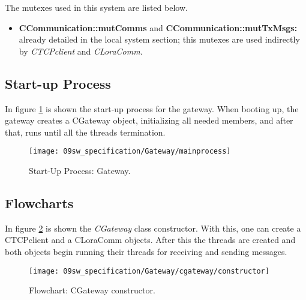 
The mutexes used in this system are listed below.

\begin{itemize}
	\item \textbf{CCommunication::mutComms} and \textbf{CCommunication::mutTxMsgs:} already detailed in the local system section; this mutexes are used indirectly by \textit{CTCPclient} and \textit{CLoraComm}.
\end{itemize}

\subsection{Start-up Process}
In figure \ref{fig:bootGateway} is shown the start-up process for the gateway. When booting up, the gateway creates a CGateway object, initializing all needed members, and after that, runs until all the threads termination.

\begin{figure}[H]
	\centering		\texttt{[image: 09sw\_specification/Gateway/mainprocess]}
	\caption{Start-Up Process: Gateway.}
	\label{fig:bootGateway}
\end{figure}

\clearpage
\subsection{Flowcharts}


In figure \ref{fig:gwtCGatewayconstructor} is shown the \textit{CGateway} class constructor. With this, one can create a CTCPclient and a CLoraComm objects. After this the threads are created and both objects begin running their threads for receiving and sending messages.

\begin{figure}[H]
	\centering
	\texttt{[image: 09sw\_specification/Gateway/cgateway/constructor]}
	\caption{Flowchart: CGateway constructor.}
	\label{fig:gwtCGatewayconstructor}
\end{figure}

